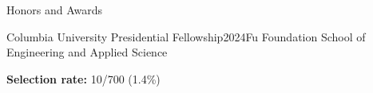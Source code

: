 \documentclass[letterpaper, 12pt]{resume}
\begin{document}
\begin{rSection}{Honors and Awards}
    \begin{rSubsection}{Columbia University Presidential Fellowship}{2024}{Fu Foundation School of Engineering and Applied Science}{}
        \item \textbf{Selection rate:} 10/700 (1.4\%)
    \end{rSubsection}
\end{rSection}




\end{document}
